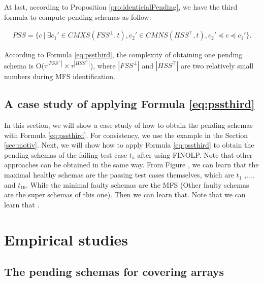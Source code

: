 {At last, according to Proposition \ref{pro:identicialPending}, we have the third formula to compute pending schemas as follow:

\begin{equation}\label{eq:pssthird}
\begin{aligned}
PSS =  \{ c\ |\ \exists c_{1}' \in CMXS(FSS^{\bot}, t), c_{2}' \in CMNS(HSS^{\top}, t), c_{2}' \preceq c \preceq c_{1}' \}.
\end{aligned}
\end{equation}

According to Formula \ref{eq:pssthird}, the complexity of obtaining one pending schema is O($ \tau^{|FSS^{\bot}|} \times \tau^{|HSS^{\top}|}$), where $|FSS^{\bot}|$ and $|HSS^{\top}|$ are two relatively small numbers during MFS identification.

\subsection{A case study of applying Formula \ref{eq:pssthird}}
In this section, we will show a case study of how to obtain the pending schemas with Formula \ref{eq:pssthird}. For consistency, we use the example in the Section \ref{sec:motiv}. Next, we will show how to  apply Formula \ref{eq:pssthird} to obtain the pending schemas of the failing test case $t_{5}$ after using FINOLP. Note that other approaches can be obtained in the same way.
From Figure , we can learn that the maximal healthy schemas are the passing test cases themselves, which are $t_{1}$ ,..., and $t_{16}$. While the minimal faulty schemas are the MFS  (Other faulty schemas are the super schemas of this one).
Then we can learn that.  Note that we can learn that .




\section{Empirical studies}\label{sec:emp}


\subsection{The pending schemas for covering arrays}

}
